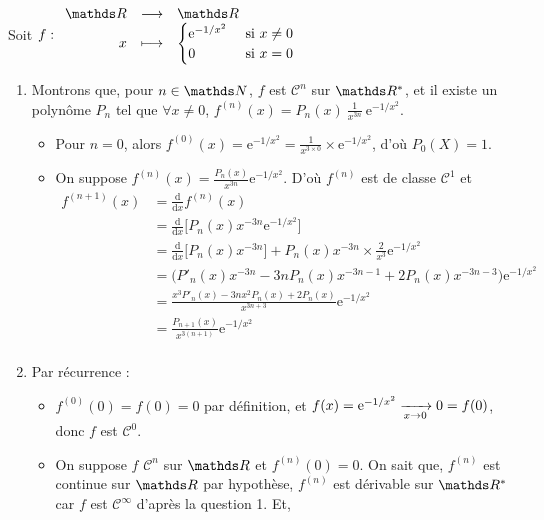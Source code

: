 \begin{exo}
	Soit $f : \begin{array}{rcl}
		\R &\longrightarrow& \R \\
		x &\longmapsto& \begin{cases}
			\mathrm{e}^{-1 / x^2}&\text{ si } x \neq 0\\
			0 &\text{ si } x = 0
		\end{cases}
	\end{array}$

	\begin{enumerate}
		\item Montrons que, pour $n \in \N$, $f$\/ est $\mathcal{C}^n$\/ sur $\R^*$, et il existe un polynôme $P_n$\/ tel que $\forall x \neq 0$, $f^{(n)}(x) = P_n(x)\:\frac{1}{x^{3n}}\: \mathrm{e}^{- 1 / x^2}$.
			\begin{itemize}
				\item Pour $n = 0$, alors $f^{(0)}(x) = \mathrm{e}^{- 1 / x^2} = \frac{1}{x^{3\times 0}}\times \mathrm{e}^{-1 / x^2}$, d'où $P_0(X) = 1$.
				\item On suppose $f^{(n)}(x) = \frac{P_n(x)}{x^{3n}} \mathrm{e}^{-1/x^2}$. D'où $f^{(n)}$\/ est de classe $\mathcal{C}^1$\/ et
					\begin{align*}
						f^{(n+1)}(x) &= \frac{\mathrm{d}}{\mathrm{d}x} f^{(n)}(x) \\
						&= \frac{\mathrm{d}}{\mathrm{d}x}\big[P_n(x) x^{-3n} \mathrm{e}^{- 1 / x^2}\big] \\
						&= \frac{\mathrm{d}}{\mathrm{d}x} \big[P_n(x) x^{-3n}\big] + P_n(x) x^{-3n} \times \frac{2}{x^3} \mathrm{e}^{-1/x^2} \\
						&= \Big( P'_n(x) x^{-3n} - 3n P_n(x) x^{-3n-1} + 2P_n(x) x^{-3n-3}\Big)\mathrm{e}^{- 1 / x^2} \\
						&= \frac{x^3 P'_n(x) - 3n x^2P_n(x) + 2P_n(x)}{x^{3n+3}} \mathrm{e}^{ - 1/x^2} \\
						&= \frac{P_{n+1}(x)}{x^{3(n+1)}} \mathrm{e}^{- 1 / x^2} \\
					\end{align*}
			\end{itemize}
		\item Par récurrence :
			\begin{itemize}
				\item $f^{(0)}(0) = f(0) = 0$\/ par définition, et $f(x) = \mathrm{e}^{- 1 / x^2} \xrightarrow[x\to 0]{} 0 = f(0)$, donc $f$\/ est $\mathcal{C}^0$.
				\item On suppose $f$\/ $\mathcal{C}^n$\/ sur $\R$\/ et $f^{(n)}(0) = 0$. On sait que, $f^{(n)}$\/ est continue sur $\R$\/ par hypothèse, $f^{(n)}$\/ est dérivable sur $\R^*$\/ car $f$\/ est $\mathcal{C}^\infty$\/ d'après la question 1. Et,

\end{itemize}
\end{enumerate}
\end{exo}
